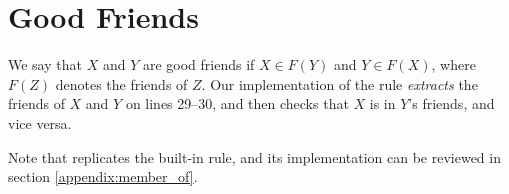 %
%

\section{Good Friends}
We say that $X$ and $Y$ are good friends if $X \in F(Y)$ and $Y \in F(X)$,
where $F(Z)$ denotes the friends of $Z$. Our implementation of the
 rule {\it extracts} the friends of $X$ and $Y$ on lines
29--30, and then checks that $X$ is in $Y$'s friends, and vice versa.


Note that  replicates the built-in  rule, and
its implementation can be reviewed in section \ref{appendix:member_of}.

